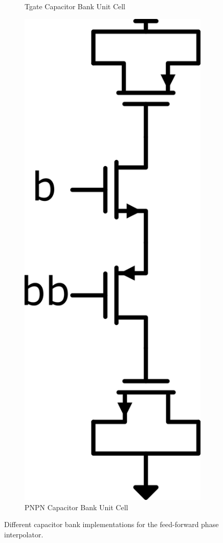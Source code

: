 \begin{figure}[htbp]
\begin{subfigure}[b]{0.15\linewidth}
    \caption{Tgate Capacitor Bank Unit Cell}
    \label{fig:Tgate_cap}
  \end{subfigure}
  \hfill
  \begin{subfigure}[b]{0.1\linewidth}
    \centering
    \includegraphics[width=\linewidth]{figures/Schematics/PNPN_cap.png}
    \caption{PNPN Capacitor Bank Unit Cell}
    \label{fig:PNPN_cap}
  \end{subfigure}
  \hfill\null
  \caption{Different capacitor bank implementations for the feed-forward phase interpolator.}
\end{figure}

